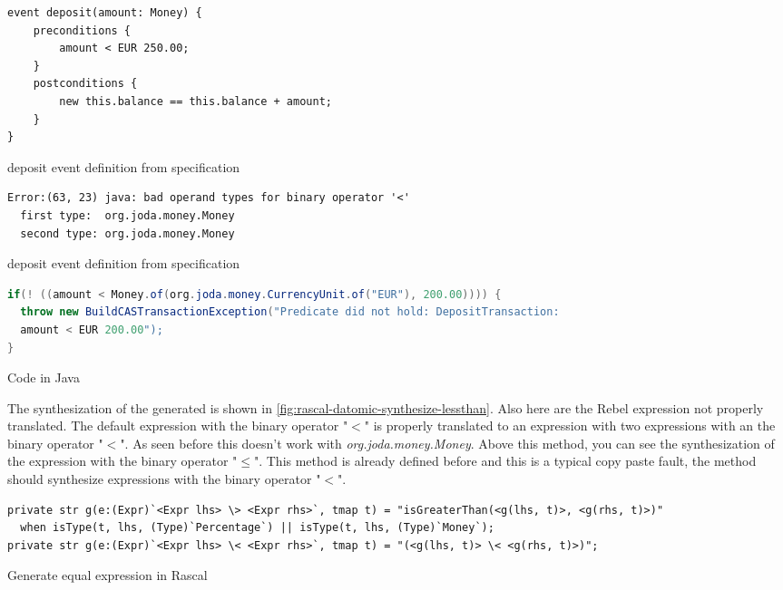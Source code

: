 
\begin{sourcecode}[h!]
\begin{lstlisting}[]
event deposit(amount: Money) {
	preconditions {
		amount < EUR 250.00;
	} 
	postconditions {
		new this.balance == this.balance + amount;
	}
}
\end{lstlisting}
\caption{deposit event definition from specification}
\label{fig:java-deposit-maxamount}
\end{sourcecode}

\begin{sourcecode}[h!]
\begin{lstlisting}[]
Error:(63, 23) java: bad operand types for binary operator '<'
  first type:  org.joda.money.Money
  second type: org.joda.money.Money
\end{lstlisting}
\caption{deposit event definition from specification}
\label{fig:java-result-lessthan-compile-error}
\end{sourcecode}

\begin{sourcecode}[h!]
\begin{lstlisting}[language=Java]
if(! ((amount < Money.of(org.joda.money.CurrencyUnit.of("EUR"), 200.00)))) {
  throw new BuildCASTransactionException("Predicate did not hold: DepositTransaction: 
  amount < EUR 200.00");
}
\end{lstlisting}
\caption{Code in Java}
\label{fig:java-lessthan-compile-error}
\end{sourcecode}

The synthesization of the generated is shown in \autoref{fig:rascal-datomic-synthesize-lessthan}. Also here are the Rebel expression not properly translated. The default expression with the binary operator "$<$" is properly translated to an expression with two expressions with an the binary operator "$<$". As seen before this doesn't work with \textit{org.joda.money.Money}. Above this method, you can see the synthesization of the expression with the binary operator "$\leq$". This method is already defined before and this is a typical copy paste fault, the method should synthesize expressions with the binary operator "$<$".


\begin{sourcecode}[h!]
\begin{lstlisting}[]
private str g(e:(Expr)`<Expr lhs> \> <Expr rhs>`, tmap t) = "isGreaterThan(<g(lhs, t)>, <g(rhs, t)>)" 
  when isType(t, lhs, (Type)`Percentage`) || isType(t, lhs, (Type)`Money`);
private str g(e:(Expr)`<Expr lhs> \< <Expr rhs>`, tmap t) = "(<g(lhs, t)> \< <g(rhs, t)>)";
\end{lstlisting}
\caption{Generate equal expression in Rascal}
\label{fig:rascal-datomic-synthesize-lessthan}
\end{sourcecode}

